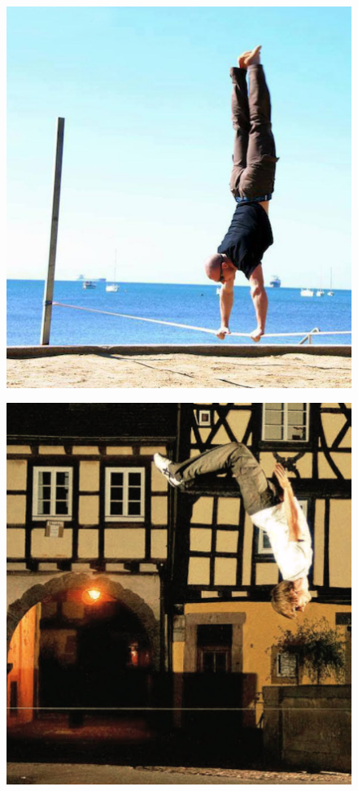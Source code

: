 \begin{figure}[htb]
	\centering
	\begin{minipage}[t]{0.45\linewidth}
		\centering
		\includegraphics[width=1\linewidth]{Pictures/3_1_trickline}
		\label{fig:trickline}
	\end{minipage}
	\hfill
	\begin{minipage}[t]{0.45\linewidth}
		\centering
		\includegraphics[width=1\linewidth]{Pictures/3_1_jumpline}

\end{minipage}
\end{figure}
